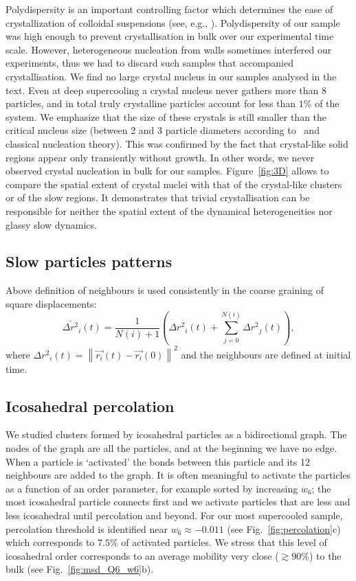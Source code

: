 Polydispersity is an important controlling factor which determines the ease of crystallization of colloidal suspensions (see, e.g., \cite{Zaccarelli2009}). 
Polydispersity of our sample was high enough to prevent crystallisation in bulk over our experimental time scale. 
However, heterogeneous nucleation from walls sometimes interfered our experiments, thus we had to discard such samples that accompanied crystallisation. 
We find no large crystal nucleus in our samples analysed in the text. Even at deep supercooling a crystal nucleus never gathers more than 8 particles, and in total truly crystalline particles account for less than $1\%$ of the system. We emphasize that the size of these crystals is still smaller than the critical nucleus size (between 2 and 3 particle diameters according to~\cite{Auer2001} and classical nucleation theory). This was confirmed by the fact that crystal-like solid regions appear only transiently without growth. In other words, we never observed crystal nucleation in bulk for our samples. Figure~\ref{fig:3D} allows to compare the spatial extent of crystal nuclei with that of the crystal-like clusters or of the slow regions. It demonstrates that trivial crystallisation can be responsible for neither the spatial extent of the dynamical heterogeneities nor glassy slow dynamics.

\subsection*{Slow particles patterns}

Above definition of neighbours is used consistently in the coarse graining of square displacements:
\begin{equation}
	\bar{\Delta r^2}_i(t) = \frac{1}{N(i)+1}\left( {\Delta r^2}_i(t) + \sum_{j=0}^{N(i)} {\Delta r^2}_j(t) \right),
	\label{eq:Mu}
\end{equation}
where ${\Delta r^2}_i(t) = \left\|\vec{r_i}(t)-\vec{r_i}(0)\right\|^2$ and the neighbours are defined at initial time. 

\subsection*{Icosahedral percolation}

We studied clusters formed by icosahedral particles as a bidirectional graph. The nodes of the graph are all the particles, and at the beginning we have no edge. When a particle is `activated' the bonds between this particle and its 12 neighbours are added to the graph. It is often meaningful to activate the particles as a function of an order parameter, for example sorted by increasing $w_6$; the most icosahedral particle connects first and we activate particles that are less and less icosahedral until percolation and beyond. For our most supercooled sample, percolation threshold is identified near $w_6\approx -0.011$ (see Fig.~\ref{fig:percolation}c) which corresponds to $7.5\%$ of activated particles. We stress that this level of icosahedral order corresponds to an average mobility very close ($\gtrsim 90\%$) to the bulk (see Fig.~\ref{fig:msd_Q6_w6}b).

